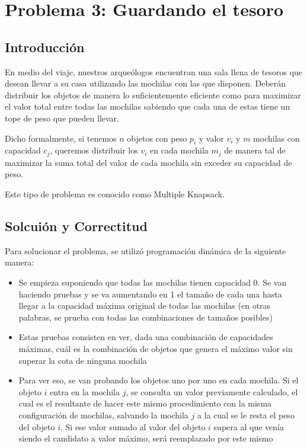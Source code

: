 \section{Problema 3: Guardando el tesoro}

\subsection{Introducción}

En medio del viaje, nuestros arqueólogos encuentran una sala llena de tesoros que desean llevar a su casa utilizando las mochilas con las que disponen. Deberán distribuir los objetos de manera lo suficientemente eficiente como para maximizar el valor total entre todas las mochilas sabiendo que cada una de estas tiene un tope de peso que pueden llevar.

Dicho formalmente, si tenemos $n$ objetos con peso $p_i$ y valor $v_i$ y $m$ mochilas con capacidad $c_j$, queremos distribuir los $v_i$ en cada mochila $m_j$ de manera tal de maximizar la suma total del valor de cada mochila sin exceder su capacidad de peso.

Este tipo de problema es conocido como Multiple Knapsack.

\subsection{Solcuión y Correctitud}

Para solucionar el problema, se utilizó programación dinámica de la siguiente manera:

\begin{itemize}
\item Se empieza suponiendo que todas las mochilas tienen capacidad 0. Se van haciendo pruebas y se va aumentando en 1 el tamaño de cada una hasta llegar a la capacidad máxima original de todas las mochilas (en otras palabras, se prueba con todas las combinaciones de tamaños posibles)
\item Estas pruebas consisten en ver, dada una combinación de capacidades máximas, cuál es la combinación de objetos que genera el máximo valor sin superar la cota de ninguna mochila
\item Para ver eso, se van probando los objetos uno por uno en cada mochila. Si el objeto $i$ entra en la mochila $j$, se consulta un valor previamente calculado, el cual es el resultante de hacer este mismo procedimiento con la misma configuración de mochilas, salvando la mochila $j$ a la cual se le resta el peso del objeto $i$. Si ese valor sumado al valor del objeto $i$ supera al que venía siendo el candidato a valor máximo, será reemplazado por este mismo
\end{itemize}


